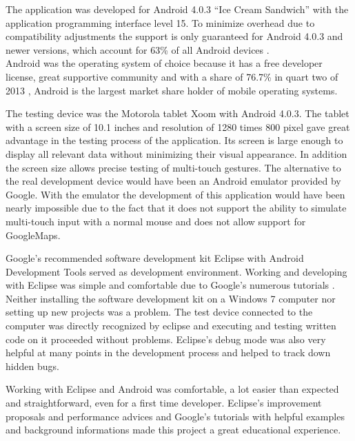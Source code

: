 The  application was developed for Android 4.0.3 ``Ice Cream Sandwich'' with the application programming interface level 15. To minimize overhead due to compatibility adjustments the support is only guaranteed for Android 4.0.3 and newer versions, which account for 63\% of all Android devices \cite{androidversionpercent}.\\
Android was the operating system of choice because it has a free developer license, great supportive community and with a share of 76.7\% in quart two of 2013 \cite{androidpercent}, Android is the largest market share holder of mobile operating systems.

The testing device was the Motorola tablet Xoom with Android 4.0.3. The tablet with a screen size of 10.1 inches and resolution of 1280 times 800 pixel gave great advantage in the testing process of the application. Its screen is large enough to display all relevant data without minimizing their visual appearance. In addition the screen size allows precise testing of multi-touch gestures. The alternative to the real development device would have been an Android emulator provided by Google. With the emulator the development of this application would have been nearly impossible due to the fact that it does not support the ability to simulate multi-touch input with a normal mouse and does not allow support for GoogleMaps.

Google's  recommended software development kit Eclipse with Android Development Tools served as development environment. Working and developing with Eclipse was simple and comfortable due to Google's numerous tutorials \cite{androidtutorials}. Neither installing the software development kit on a Windows 7 computer nor setting up new projects was a problem. %
The test device connected to the computer was directly recognized by eclipse and executing and testing written code on it proceeded without problems. Eclipse's debug mode was also very helpful at many points in the development process and helped to track down hidden bugs.

Working with Eclipse and Android was comfortable, a lot easier than expected and straightforward, even for a first time developer. Eclipse's improvement proposals and performance advices and Google's tutorials with helpful examples and background informations made this project a great educational experience.